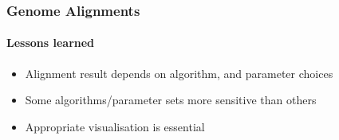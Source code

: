 \documentclass[table]{beamer}
\begin{document}
    \begin{frame}
      \frametitle{Genome Alignments}   
      \framesubtitle{Lessons learned}   
      \begin{itemize}
        \item Alignment result depends on algorithm, and parameter choices
        \item Some algorithms/parameter sets more sensitive than others
        \item Appropriate visualisation is essential
      \end{itemize}
    \end{frame}


%
\end{document}
